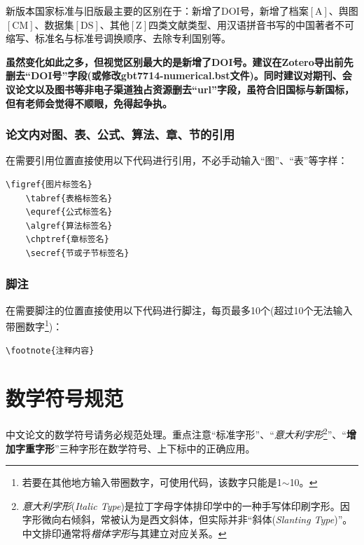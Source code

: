 新版本国家标准与旧版最主要的区别\cite{XuYu2016GB77142015YuGB}在于：新增了DOI号，新增了档案$[\mathrm{A}]$、舆图$[\mathrm{CM}]$、数据集$[\mathrm{DS}]$、其他$[\mathrm{Z}]$四类文献类型、用汉语拼音书写的中国著者不可缩写、标准名与标准号调换顺序、去除专利国别等。

\textbf{虽然变化如此之多，但视觉区别最大的是新增了DOI号。建议在Zotero导出前先删去“DOI号”字段(或修改gbt7714-numerical.bst文件)。同时建议对期刊、会议论文以及图书等非电子渠道独占资源删去“url”字段，虽符合旧国标与新国标，但有老师会觉得不顺眼，免得起争执。}

\subsubsection{论文内对图、表、公式、算法、章、节的引用}

在需要引用位置直接使用以下代码进行引用，不必手动输入“图”、“表”等字样：

\begin{lstlisting}[language={[LaTeX]TeX}]
    \figref{图片标签名}
    \tabref{表格标签名}
    \equref{公式标签名}
    \algref{算法标签名}
    \chptref{章标签名}
    \secref{节或子节标签名}
\end{lstlisting}

\subsubsection{脚注}

在需要脚注的位置直接使用以下代码进行脚注，每页最多10个(超过10个无法输入带圈数字\footnote{若要在其他地方输入带圈数字，可使用代码，该数字只能是1$\sim$10。})：

\begin{lstlisting}[language={[LaTeX]TeX}]
    \footnote{注释内容}
\end{lstlisting}


\clearpage
\section{数学符号规范}

中文论文的数学符号请务必规范处理。重点注意“标准字形”、“\textit{意大利字形}\footnote{\textit{意大利字形}(\textit{Italic Type})是拉丁字母字体排印学中的一种手写体印刷字形。因字形微向右倾斜，常被认为是西文斜体，但实际并非“斜体({\hspace{-7em}\textsl{Slanting Type}})”。中文排印通常将\textit{楷体字形}与其建立对应关系。}”、“\textbf{增加字重字形}”三种字形在数学符号、上下标中的正确应用。

